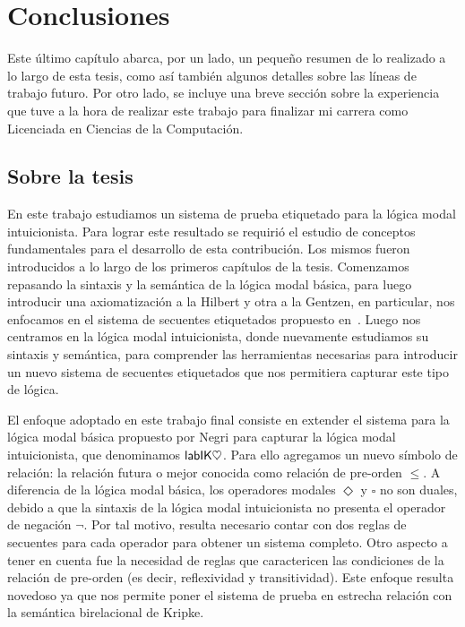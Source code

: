 \chapter{Conclusiones}
\label{cap:conclusion}

Este último capítulo abarca, por un lado, un pequeño resumen de lo realizado a lo largo de esta tesis, como así también algunos detalles sobre las líneas de trabajo futuro. Por otro lado, se incluye una breve sección sobre la experiencia que tuve a la hora de realizar este trabajo para finalizar mi carrera como Licenciada en Ciencias de la Computación.

\section{Sobre la tesis}

En este trabajo estudiamos un sistema de prueba etiquetado para la lógica modal intuicionista. Para lograr este resultado se requirió el estudio de conceptos fundamentales para el desarrollo de esta contribución. Los mismos fueron introducidos a lo largo de los primeros capítulos de la tesis. Comenzamos repasando la sintaxis y la semántica de la lógica modal básica, para luego introducir una axiomatización a la Hilbert y otra a la Gentzen, en particular, nos enfocamos en el sistema de secuentes etiquetados propuesto en~\cite{negri2005}. Luego nos centramos en la lógica modal intuicionista, donde nuevamente estudiamos su sintaxis y semántica, para comprender las herramientas necesarias para introducir un nuevo sistema de secuentes etiquetados que nos permitiera capturar este tipo de lógica. 

El enfoque adoptado en este trabajo final consiste  en extender el sistema para la lógica modal básica propuesto por Negri para capturar la lógica modal intuicionista, que denominamos $\mathsf{labIK\heartsuit}$. Para ello agregamos un nuevo símbolo de relación: la relación futura o mejor conocida como relación de pre-orden $\le$. A diferencia de la lógica modal básica, los operadores modales $\Diamond$ y $\square$ no son duales, debido a que la sintaxis de la lógica modal intuicionista no presenta el operador de negación $\neg$. Por tal motivo, resulta necesario contar con dos reglas de secuentes para cada operador para obtener un sistema completo. Otro aspecto a tener en cuenta fue la necesidad de reglas que caractericen las condiciones de la relación de pre-orden (es decir, reflexividad y transitividad). Este enfoque resulta novedoso ya que nos permite poner el sistema de prueba en estrecha relación con la semántica birelacional de Kripke.


